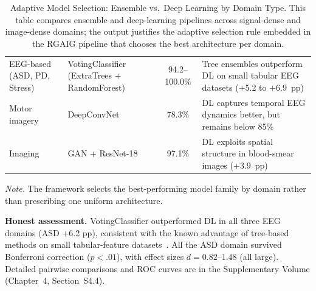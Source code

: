 \begin{table}[!htbp]
\tablestripes\tablefontsize
\caption[Adaptive Model Selection: Ensemble vs.Deep Learning by]{Adaptive Model Selection: Ensemble vs.\ Deep Learning by Domain Type. This table compares ensemble and deep-learning pipelines across signal-dense and image-dense domains; the output justifies the adaptive selection rule embedded in the RGAIG pipeline that chooses the best architecture per domain.}
\tablefontsize
\begin{tabularx}{\textwidth}{@{} >{\raggedright\arraybackslash}p{2.5cm} >{\raggedright\arraybackslash}p{3.5cm} C L @{}}
\toprule
{} &  &  &  \\
\midrule
EEG-based (ASD, PD, Stress) & VotingClassifier (ExtraTrees + RandomForest) & 94.2--100.0\% & Tree ensembles outperform DL on small tabular EEG datasets (+5.2 to +6.9~pp) \\
\addlinespace
Motor imagery  & DeepConvNet & 78.3\% & DL captures temporal EEG dynamics better, but remains below 85\% \\
\addlinespace
Imaging  & GAN + ResNet-18 & 97.1\% & DL exploits spatial structure in blood-smear images (+3.9~pp) \\
\bottomrule
\end{tabularx}
\vspace{0.5em}\noindent\textit{Note.} The framework selects the best-performing model family by domain rather than prescribing one uniform architecture.
\end{table}
\fi %

\textbf{Honest assessment.} VotingClassifier outperformed DL in all three EEG domains (ASD +6.2 pp), consistent with the known advantage of tree-based methods on small tabular-feature datasets~\cite{grinsztajn2022tree}. All the ASD domain survived Bonferroni correction ($p < .01$), with effect sizes $d = 0.82$--$1.48$ (all large). Detailed pairwise comparisons and ROC curves are in the Supplementary Volume (Chapter~4, Section~S4.4).

